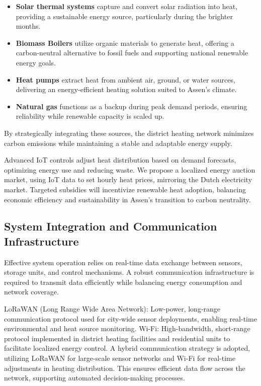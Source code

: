 \documentclass[conference]{IEEEtran}
\begin{document}
\begin{itemize}
    \item \textbf{Solar thermal systems} capture and convert solar radiation into heat, providing a sustainable energy source, particularly during the brighter months.
\end{itemize}
\begin{itemize}
    \item \textbf{Biomass Boilers} utilize organic materials to generate heat, offering a carbon-neutral alternative to fossil fuels and supporting national renewable energy goals.
\end{itemize}
\begin{itemize}
    \item \textbf{Heat pumps} extract heat from ambient air, ground, or water sources, delivering an energy-efficient heating solution suited to Assen’s climate.
\end{itemize}
\begin{itemize}
    \item \textbf{Natural gas} functions as a backup during peak demand periods, ensuring reliability while renewable capacity is scaled up.
\end{itemize}
By strategically integrating these sources, the district heating network minimizes carbon emissions while maintaining a stable and adaptable energy supply.

Advanced IoT controls adjust heat distribution based on demand forecasts, optimizing energy use and reducing waste. We propose a localized energy auction market, using IoT data to set hourly heat prices, mirroring the Dutch electricity market. Targeted subsidies will incentivize renewable heat adoption, balancing economic efficiency and sustainability in Assen's transition to carbon neutrality.

\subsection{System Integration and Communication Infrastructure}

Effective system operation relies on real-time data exchange between sensors, storage units, and control mechanisms. A robust communication infrastructure is required to transmit data efficiently while balancing energy consumption and network coverage.

LoRaWAN (Long Range Wide Area Network): Low-power, long-range communication protocol used for city-wide sensor deployments, enabling real-time environmental and heat source monitoring.
Wi-Fi: High-bandwidth, short-range protocol implemented in district heating facilities and residential units to facilitate localized energy control.
A hybrid communication strategy is adopted, utilizing LoRaWAN for large-scale sensor networks and Wi-Fi for real-time adjustments in heating distribution. This ensures efficient data flow across the network, supporting automated decision-making processes.
\end{document}
